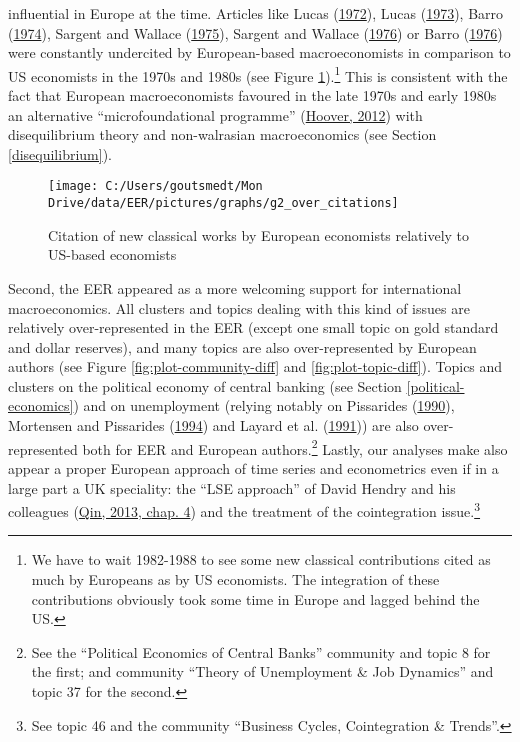 \documentclass[]{elsarticle} %
\begin{document}
influential in Europe at the time. Articles like Lucas
(\protect\hyperlink{ref-lucas1972}{1972}), Lucas
(\protect\hyperlink{ref-lucas1973}{1973}), Barro
(\protect\hyperlink{ref-barro1974}{1974}), Sargent and Wallace
(\protect\hyperlink{ref-sargent1975}{1975}), Sargent and Wallace
(\protect\hyperlink{ref-sargent1976}{1976}) or Barro
(\protect\hyperlink{ref-barro1976}{1976}) were constantly undercited by
European-based macroeconomists in comparison to US economists in the
1970s and 1980s (see Figure \ref{fig:plot-new-classical}).\footnote{We
  have to wait 1982-1988 to see some new classical contributions cited
  as much by Europeans as by US economists. The integration of these
  contributions obviously took some time in Europe and lagged behind the
  US.} This is consistent with the fact that European macroeconomists
favoured in the late 1970s and early 1980s an alternative
``microfoundational programme''
(\protect\hyperlink{ref-hoover2012}{Hoover, 2012}) with disequilibrium
theory and non-walrasian macroeconomics (see Section
\ref{disequilibrium}).

\begin{figure}[h]

{\centering \texttt{[image: C:/Users/goutsmedt/Mon Drive/data/EER/pictures/graphs/g2\_over\_citations]} 

}

\caption{Citation of new classical works by European economists relatively to US-based economists}\label{fig:plot-new-classical}
\end{figure}

Second, the EER appeared as a more welcoming support for international
macroeconomics. All clusters and topics dealing with this kind of issues
are relatively over-represented in the EER (except one small topic on
gold standard and dollar reserves), and many topics are also
over-represented by European authors (see Figure
\ref{fig:plot-community-diff} and \ref{fig:plot-topic-diff}). Topics and
clusters on the political economy of central banking (see Section
\ref{political-economics}) and on unemployment (relying notably on
Pissarides (\protect\hyperlink{ref-pissarides1990}{1990}), Mortensen and
Pissarides (\protect\hyperlink{ref-mortensen1994}{1994}) and Layard et
al. (\protect\hyperlink{ref-layard1991a}{1991})) are also
over-represented both for EER and European authors.\footnote{See the
  ``Political Economics of Central Banks'' community and topic 8 for the
  first; and community ``Theory of Unemployment \& Job Dynamics'' and
  topic 37 for the second.} Lastly, our analyses make also appear a
proper European approach of time series and econometrics even if in a
large part a UK speciality: the ``LSE approach'' of David Hendry and his
colleagues (\protect\hyperlink{ref-qin2013a}{Qin, 2013, chap. 4}) and
the treatment of the cointegration issue.\footnote{See topic 46 and the
  community ``Business Cycles, Cointegration \& Trends''.}
\end{document}
